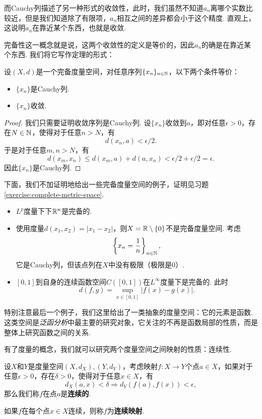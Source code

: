 而Cauchy列描述了另一种形式的收敛性，此时，我们虽然不知道$a_n$离哪个实数比较近，但是我们知道除了有限项，$a_n$相互之间的差异都会小于这个精度. 直观上，这说明$a_n$在靠近某个东西，也就是收敛. 

完备性这一概念就是说，这两个收敛性的定义是等价的，因此$a_n$的确是在靠近某个东西. 我们将它写作定理的形式：

\begin{theorem}\label{thm:complete-metric-space-convergence}
    设$(X,d)$是一个完备度量空间，对任意序列$\{x_n\}_{n\in\mathbb{N}}$，以下两个条件等价：
    \begin{itemize}
        \item $\{x_n\}$是Cauchy列.
        \item $\{x_n\}$收敛.
    \end{itemize}
\end{theorem}
\begin{proof}
    我们只需要证明收敛序列是Cauchy列. 设$\{x_n\}$收敛到$a$，即对任意$\epsilon>0$，存在$N\in\mathbb{N}$，使得对于任意$n>N$，有
    \[d(x_n,a)<\epsilon/2.\]
    于是对于任意$m,n>N$，有
    \[d(x_m,x_n)\leq d(x_m,a)+d(a,x_n)<\epsilon/2+\epsilon/2=\epsilon.\]
    因此$\{x_n\}$是Cauchy列.
\end{proof}

下面，我们不加证明地给出一些完备度量空间的例子，证明见习题 \ref{exercise:complete-metric-space}.
\begin{example}\label{ex:complete-metric-space}
\begin{itemize}
\item $L^p$度量下下$\mathbb{R}^n$是完备的.
\item 使用度量$d(x_1,x_2)=|x_1-x_2|$，则$X=\mathbb{R}\setminus\{0\}$不是完备度量空间. 考虑
\[\left\{x_n=\frac1n\right\}_{n\in\mathbb{N}},\]
它是Cauchy列，但该点列在$X$中没有极限（极限是$0$）.

\item $[0,1]$到自身的连续函数空间$C([0,1])$在$L^\infty$度量下是完备的.
此时
\[d(f,g)=\sup_{x\in[0,1]}|f(x)-g(x)|.\]
\end{itemize}
\end{example}

特别注意最后一个例子，我们这里给出了一类抽象的度量空间：它的元素是函数. 这类空间是\textit{泛函分析}中最主要的研究对象，它关注的不再是函数局部的性质，而是整体上研究函数之间的关系.

有了度量的概念，我们就可以研究两个度量空间之间映射的性质：连续性. 

\begin{definition}[连续映射]
设$X$和$Y$是度量空间$(X,d_X),(Y,d_Y)$，考虑映射$f:X\to Y$个点$a\in X$，如果对于任意$\epsilon>0$，存在$\delta>0$，使得对于任意$x\in X$，有
    \[d_X(a,x) < \delta\Rightarrow d_Y(f(a),f(x))<\epsilon,\]
那么我们称$f$在点$a$是\textbf{连续的}.

如果$f$在每个点$x\in X$连续，则称$f$为\textbf{连续映射}.  
\end{definition}

